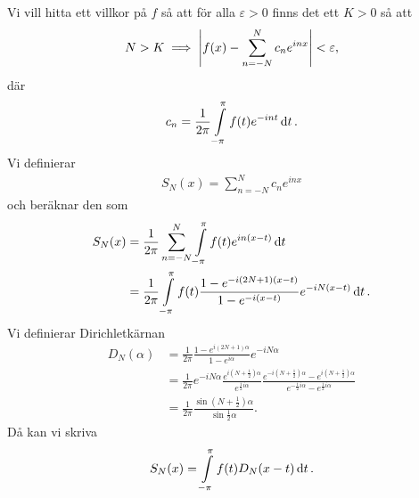 \proof
Vi vill hitta ett villkor på $f$ så att för alla $\varepsilon > 0$ finns det ett $K > 0$ så att
\begin{align*}
	N > K \implies \abs{f(x) - \sum\limits_{n = -N}^{N}c_{n}e^{inx}} < \varepsilon,
\end{align*}
där
\begin{align*}
	c_{n} = \frac{1}{2\pi}\int\limits_{-\pi}^{\pi}f(t)e^{-int}\dd{t}.
\end{align*}
Vi definierar
\begin{align*}
	S_{N}(x) = \sum\limits_{n = -N}^{N}c_{n}e^{inx}
\end{align*}
och beräknar den som
\begin{align*}
	S_{N}(x) &= \frac{1}{2\pi}\sum\limits_{n = -N}^{N}\int\limits_{-\pi}^{\pi}f(t)e^{in(x - t)}\dd{t} \\
	         &= \frac{1}{2\pi}\int\limits_{-\pi}^{\pi}f(t)\frac{1 - e^{-i(2N + 1)(x - t)}}{1 - e^{-i(x - t)}}e^{-iN(x - t)}\dd{t}.
\end{align*}
Vi definierar Dirichletkärnan
\begin{align*}
	D_{N}(\alpha) &= \frac{1}{2\pi}\frac{1 - e^{i(2N + 1)\alpha}}{1 - e^{i\alpha}}e^{-iN\alpha} \\
	              &= \frac{1}{2\pi}e^{-iN\alpha}\frac{e^{i\left(N + \frac{1}{2}\right)\alpha}}{e^{\frac{1}{2}i\alpha}}\frac{e^{-i\left(N + \frac{1}{2}\right)\alpha} - e^{i\left(N + \frac{1}{2}\right)\alpha}}{e^{-\frac{1}{2}i\alpha} - e^{\frac{1}{2}i\alpha}} \\
	              &= \frac{1}{2\pi}\frac{\sin{\left(N + \frac{1}{2}\right)\alpha}}{\sin{\frac{1}{2}\alpha}}.
\end{align*}
Då kan vi skriva
\begin{align*}
	S_{N}(x) = \int\limits_{-\pi}^{\pi}f(t)D_{N}(x - t)\dd{t}.
\end{align*}